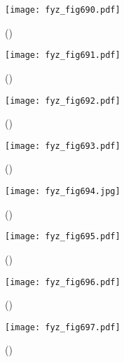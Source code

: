 {    \begin{figure}[ht!] %
      \centering
      \texttt{[image: fyz\_fig690.pdf]}
      \caption{
               (\cite[s.~707]{Feynman02})}
      \label{fyz_fig690}
    \end{figure}

    \begin{figure}[ht!] %
      \centering
      \texttt{[image: fyz\_fig691.pdf]}
      \caption{
               (\cite[s.~707]{Feynman02})}
      \label{fyz_fig691}
    \end{figure}


    \begin{figure}[ht!] %
      \centering
      \texttt{[image: fyz\_fig692.pdf]}
      \caption{
               (\cite[s.~707]{Feynman02})}
      \label{fyz_fig692}
    \end{figure}

    \begin{figure}[ht!] %
      \centering
      \texttt{[image: fyz\_fig693.pdf]}
      \caption{
               (\cite[s.~707]{Feynman02})}
      \label{fyz_fig693}
    \end{figure}

    \begin{figure}[ht!] %
      \centering
      \texttt{[image: fyz\_fig694.jpg]}
      \caption{
               (\cite[s.~707]{Feynman02})}
      \label{fyz_fig694}
    \end{figure}

    \begin{figure}[ht!] %
      \centering
      \texttt{[image: fyz\_fig695.pdf]}
      \caption{
               (\cite[s.~707]{Feynman02})}
      \label{fyz_fig695}
    \end{figure}

    \begin{figure}[ht!] %
      \centering
      \texttt{[image: fyz\_fig696.pdf]}
      \caption{
               (\cite[s.~707]{Feynman02})}
      \label{fyz_fig696}
    \end{figure}

    \begin{figure}[ht!] %
      \centering
      \texttt{[image: fyz\_fig697.pdf]}
      \caption{
               (\cite[s.~707]{Feynman02})}
      \label{fyz_fig697}
    \end{figure}

}
